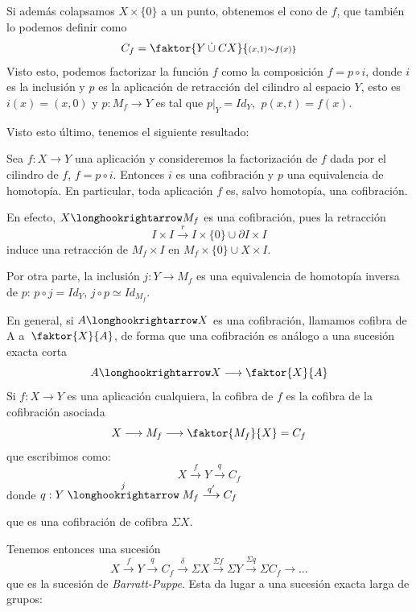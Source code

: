 Si además colapsamos $X \times \{0\}$ a un punto, obtenemos el cono de $f$, que también lo podemos definir como 
\[ C_f = \faktor{Y \: \dot{\cup} \: CX}{\scriptstyle (x,1) \sim f(x)} \]
Visto esto, podemos factorizar la función $f$ como la composición $f = p \circ i$, donde $i$ es la inclusión y $p$ es la aplicación de retracción del cilindro al espacio $Y$, esto es $i(x) = (x,0)$  y $p : M_f \longrightarrow Y$  es tal que $p \vert_Y = Id_Y$, $\ p(x,t) = f(x)$. \par 
Visto esto último, tenemos el siguiente resultado:
\begin{teor}
Sea $f : X \longrightarrow Y$ una aplicación y consideremos la factorización de $f$ dada por el cilindro de $f$, $f = p \circ i$. Entonces $i$ es una cofibración y $p$ una equivalencia de homotopía. En particular, toda aplicación $f$ es, salvo homotopía, una cofibración. 
\end{teor}
\begin{demo}
En efecto, $X \longhookrightarrow M_f$ es una cofibración, pues la retracción 
\[
I \times I \stackrel{r}{\longrightarrow} I \times \{0\} \cup \partial I \times I
\]
induce una retracción de $M_f \times I$ en $M_f \times \{0\} \cup X \times  I$. \par 
Por otra parte, la inclusión $j : Y \longrightarrow M_f$ es una equivalencia de homotopía inversa de $p$: $p \circ j = Id_Y$, $j \circ p \simeq Id_{M_f}$.
\end{demo}
En general, si $A \longhookrightarrow X$ es una cofibración, llamamos cofibra de A a $\: \faktor{X}{A}$, de forma que una cofibración es análogo a una sucesión exacta corta
\[ A \longhookrightarrow X \longrightarrow \faktor{X}{A} \]
Si $f : X \longrightarrow Y$ es una aplicación cualquiera, la cofibra de $f$ es la cofibra de la cofibración asociada
\[ X \longrightarrow M_f \longrightarrow \faktor{M_f}{X} = C_f \]
que escribimos como: 
\[ X \stackrel{f}{\longrightarrow} Y \stackrel{q}{\longrightarrow} C_f  \]
donde $q : Y \stackrel{j}{\longhookrightarrow} M_f \stackrel{q'}{\longrightarrow} C_f $\par 
{}
que es una cofibración de cofibra $\Sigma X$. \par
Tenemos entonces una sucesión
\[ X \stackrel{f}{\longrightarrow} Y \stackrel{q}{\longrightarrow} C_f \stackrel{\delta}{\longrightarrow} \Sigma X \stackrel{\Sigma f}{\longrightarrow} \Sigma Y \stackrel{\Sigma q}{\longrightarrow} \Sigma C_f \longrightarrow \dots \]
que es la sucesión de \textit{Barratt-Puppe}. Esta da lugar a una sucesión exacta larga de grupos:
